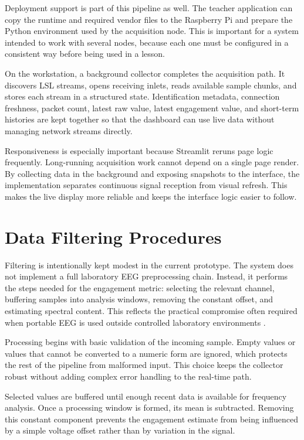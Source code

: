 Deployment support is part of this pipeline as well. The teacher application can copy the runtime and required vendor files to the Raspberry Pi and prepare the Python environment used by the acquisition node. This is important for a system intended to work with several nodes, because each one must be configured in a consistent way before being used in a lesson.


On the workstation, a background collector completes the acquisition path. It discovers LSL streams, opens receiving inlets, reads available sample chunks, and stores each stream in a structured state. Identification metadata, connection freshness, packet count, latest raw value, latest engagement value, and short-term histories are kept together so that the dashboard can use live data without managing network streams directly.


Responsiveness is especially important because Streamlit reruns page logic frequently. Long-running acquisition work cannot depend on a single page render. By collecting data in the background and exposing snapshots to the interface, the implementation separates continuous signal reception from visual refresh. This makes the live display more reliable and keeps the interface logic easier to follow.

\section{Data Filtering Procedures}\label{sect:datafiltproc}
Filtering is intentionally kept modest in the current prototype. The system does not implement a full laboratory EEG preprocessing chain. Instead, it performs the steps needed for the engagement metric: selecting the relevant channel, buffering samples into analysis windows, removing the constant offset, and estimating spectral content. This reflects the practical compromise often required when portable EEG is used outside controlled laboratory environments \cite{Xu2018}.


Processing begins with basic validation of the incoming sample. Empty values or values that cannot be converted to a numeric form are ignored, which protects the rest of the pipeline from malformed input. This choice keeps the collector robust without adding complex error handling to the real-time path.


Selected values are buffered until enough recent data is available for frequency analysis. Once a processing window is formed, its mean is subtracted. Removing this constant component prevents the engagement estimate from being influenced by a simple voltage offset rather than by variation in the signal.


